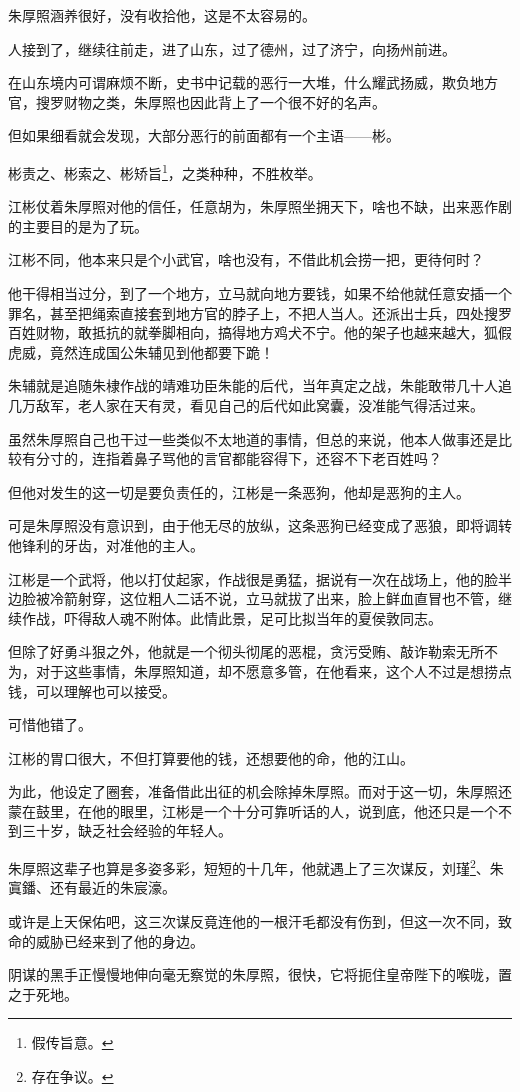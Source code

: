 \begin{multicols}{\theparacolNo}
朱厚照涵养很好，没有收拾他，这是不太容易的。

人接到了，继续往前走，进了山东，过了德州，过了济宁，向扬州前进。

在山东境内可谓麻烦不断，史书中记载的恶行一大堆，什么耀武扬威，欺负地方官，搜罗财物之类，朱厚照也因此背上了一个很不好的名声。

但如果细看就会发现，大部分恶行的前面都有一个主语——彬。

彬责之、彬索之、彬矫旨\footnote{假传旨意。}，之类种种，不胜枚举。

江彬仗着朱厚照对他的信任，任意胡为，朱厚照坐拥天下，啥也不缺，出来恶作剧的主要目的是为了玩。

江彬不同，他本来只是个小武官，啥也没有，不借此机会捞一把，更待何时？

他干得相当过分，到了一个地方，立马就向地方要钱，如果不给他就任意安插一个罪名，甚至把绳索直接套到地方官的脖子上，不把人当人。还派出士兵，四处搜罗百姓财物，敢抵抗的就拳脚相向，搞得地方鸡犬不宁。他的架子也越来越大，狐假虎威，竟然连成国公朱辅见到他都要下跪！

朱辅就是追随朱棣作战的靖难功臣朱能的后代，当年真定之战，朱能敢带几十人追几万敌军，老人家在天有灵，看见自己的后代如此窝囊，没准能气得活过来。

虽然朱厚照自己也干过一些类似不太地道的事情，但总的来说，他本人做事还是比较有分寸的，连指着鼻子骂他的言官都能容得下，还容不下老百姓吗？

但他对发生的这一切是要负责任的，江彬是一条恶狗，他却是恶狗的主人。

可是朱厚照没有意识到，由于他无尽的放纵，这条恶狗已经变成了恶狼，即将调转他锋利的牙齿，对准他的主人。

江彬是一个武将，他以打仗起家，作战很是勇猛，据说有一次在战场上，他的脸半边脸被冷箭射穿，这位粗人二话不说，立马就拔了出来，脸上鲜血直冒也不管，继续作战，吓得敌人魂不附体。此情此景，足可比拟当年的夏侯敦同志。

但除了好勇斗狠之外，他就是一个彻头彻尾的恶棍，贪污受贿、敲诈勒索无所不为，对于这些事情，朱厚照知道，却不愿意多管，在他看来，这个人不过是想捞点钱，可以理解也可以接受。

可惜他错了。

江彬的胃口很大，不但打算要他的钱，还想要他的命，他的江山。

为此，他设定了圈套，准备借此出征的机会除掉朱厚照。而对于这一切，朱厚照还蒙在鼓里，在他的眼里，江彬是一个十分可靠听话的人，说到底，他还只是一个不到三十岁，缺乏社会经验的年轻人。

朱厚照这辈子也算是多姿多彩，短短的十几年，他就遇上了三次谋反，刘瑾\footnote{存在争议。}、朱寘鐇、还有最近的朱宸濠。

或许是上天保佑吧，这三次谋反竟连他的一根汗毛都没有伤到，但这一次不同，致命的威胁已经来到了他的身边。

阴谋的黑手正慢慢地伸向毫无察觉的朱厚照，很快，它将扼住皇帝陛下的喉咙，置之于死地。
\ifnum{}
	\end{multicols}
\fi
\newpage

